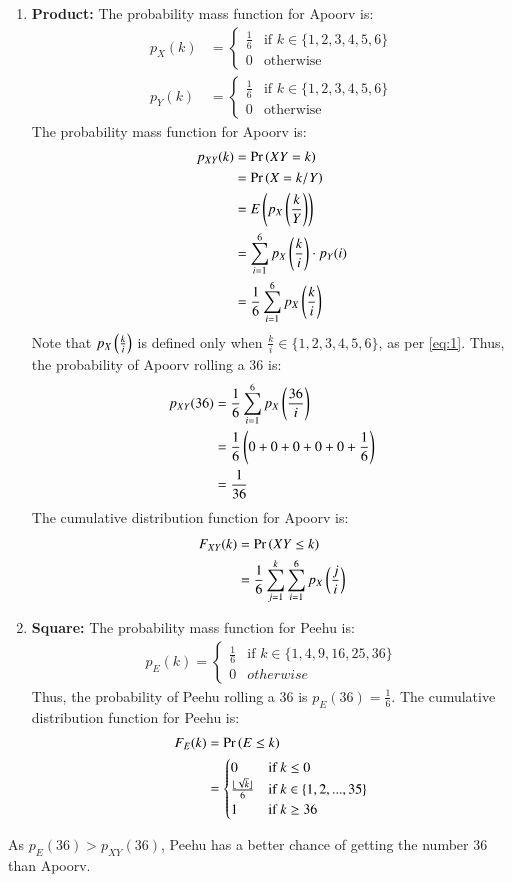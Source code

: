 \documentclass[journal,12pt,twocolumn]{IEEEtran}
\theoremstyle{remark}
\begin{document}
\begin{enumerate}
    \item \textbf{Product:} The probability mass function for Apoorv is:
\begin{align}
    p_X(k) &= 
    \begin{cases}
        \frac{1}{6} & \text{if }k \in \{1, 2, 3, 4, 5, 6\}\\
        0 & \text{otherwise}
    \end{cases}\label{eq:1}\\
    p_Y(k) &=
    \begin{cases}
        \frac{1}{6} & \text{if }k \in \{1, 2, 3, 4, 5, 6\}\\
        0 & \text{otherwise}
    \end{cases}
\end{align}
The probability mass function for Apoorv is:
\begin{align}
    p_{XY}(k) &= \Pr\left(XY = k\right)\\
    &= \Pr\left(X = k/Y\right)\\
    &= E\left(p_X\left(\frac{k}{Y}\right)\right)\\
    &= \sum_{i = 1}^{6} p_X\left(\frac{k}{i}\right) \cdot p_Y(i)\\
    &= \frac{1}{6} \sum_{i = 1}^{6} p_X\left(\frac{k}{i}\right)
\end{align}
Note that $p_X\left(\frac{k}{i}\right)$ is defined only when $\frac{k}{i} \in \{1, 2, 3, 4, 5, 6\}$, as per \eqref{eq:1}.
Thus, the probability of Apoorv rolling a 36 is:
\begin{align}
    p_{XY}(36) &= \frac{1}{6} \sum_{i = 1}^{6} p_X\left(\frac{36}{i}\right)\\
    &= \frac{1}{6}\left(0 + 0 + 0 + 0 + 0 + \frac{1}{6}\right)\\
    &= \frac{1}{36}
\end{align}
The cumulative distribution function for Apoorv is:
\begin{align}
    F_{XY}(k) &= \Pr\left(XY \leq k\right)\\
    &= \frac{1}{6} \sum_{j = 1}^{k} \sum_{i = 1}^{6} p_X\left(\frac{j}{i}\right)
\end{align}
    \item \textbf{Square:}
The probability mass function for Peehu is:
\begin{align}
   p_E(k) = 
   \begin{cases}
        \frac{1}{6} & \text{if }k \in \{1, 4, 9, 16, 25, 36\}\\
        0 & otherwise
    \end{cases}
\end{align}
Thus, the probability of Peehu rolling a 36 is $p_E(36) = \frac{1}{6}$.
The cumulative distribution function for Peehu is:
\begin{align}
    F_E(k) &= \Pr\left(E \leq k\right)\\
    &= 
    \begin{cases}
        0 & \text{if }k \leq 0\\
        \frac{\lfloor\sqrt{k}\rfloor}{6} & \text{if }k \in \{1, 2, ..., 35\}\\
        1 & \text{if }k \geq 36
    \end{cases}
\end{align}
\end{enumerate}
As $p_{E}(36) > p_{XY}(36)$, Peehu has a better chance of getting the number 36 than Apoorv.
\end{document}

